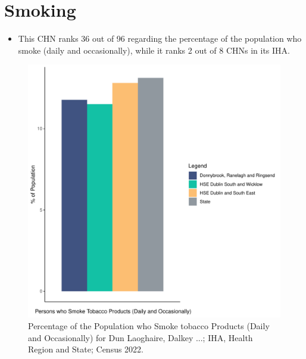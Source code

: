\documentclass{article}
\begin{document}
\pagebreak

\section{Smoking}\label{sect:Smoking}
\begin{itemize}
\item This CHN ranks  36 out of 96 regarding the percentage of the population who smoke (daily and occasionally), while it ranks   2 out of 8 CHNs in its IHA.
\end{itemize}
\begin{figure}[H]
	\centering
	\includegraphics[width = 120mm]{../figures/SmokingED.pdf}
	\caption{Percentage of the Population who Smoke tobacco Products (Daily and Occasionally) for Dun Laoghaire, Dalkey ...; IHA, Health Region and State; Census 2022.}
	\label{fig:2ae19629-1a6a-13a3-e055-000000000001}
	\end{figure}
	
\end{document}
